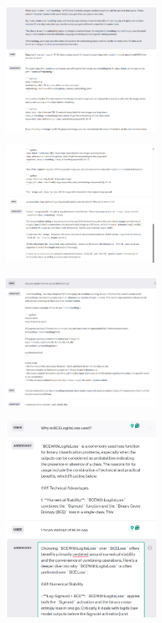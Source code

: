 \documentclass{article}
\begin{document}
\begin{figure}[H]
    \centering
    \includegraphics[width=0.5\textwidth]{report_data/g-7.png}
\end{figure}

\begin{figure}[H]
    \centering
    \includegraphics[width=0.5\textwidth]{report_data/g-8.png}
\end{figure}

\begin{figure}[H]
    \centering
    \includegraphics[width=0.5\textwidth]{report_data/g-9.png}
\end{figure}

\begin{figure}[H]
    \centering
    \includegraphics[width=0.5\textwidth]{report_data/g-10.png}
\end{figure}
\end{document}
